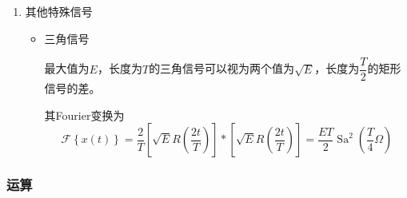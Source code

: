 \documentclass[UTF8,fontset=fandol,zihao=5]{ctexart}
\newcommand{\FF}{\mathcal{F}}
\newcommand{\Sa}{\operatorname{Sa}}
\begin{document}
\begin{enumerate}
\begin{itemize}
      \begin{methodbox}[符号信号]
        符号函数记为
        \[
          \operatorname{sgn}(t) =
          \begin{cases}
            1, & t > 0,\\
            -1, & t < 0.
          \end{cases}
          =2 u(t)-1
        \]
      \end{methodbox}

    \end{itemize}

    \item 其他特殊信号

    \begin{itemize}
      \item 三角信号
      
      最大值为$E$，长度为$T$的三角信号可以视为两个值为$\sqrt{E}$，长度为$\dfrac{T}{2}$的矩形信号的差。
      
      其Fourier变换为
      \[
      \FF \left\{ x(t) \right\} =\frac{2}{T} \left[\sqrt{E}R\left(\frac{2t}{T}\right)\right] \ast \left[\sqrt{E}R\left(\frac{2t}{T}\right)\right] = \dfrac{ET}{2} \Sa^2 \left( \frac{T}{4} \varOmega \right)
      \]
    \end{itemize}

  \end{enumerate}
  \subsubsection{运算}
\end{document}

